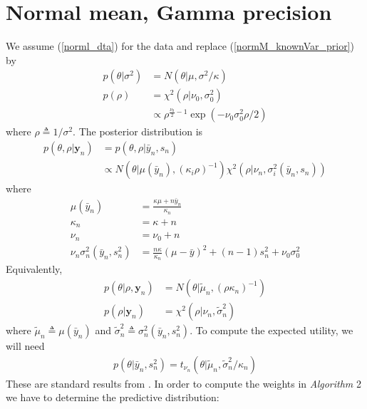 \documentclass[11pt]{article}
\begin{document}
\section{Normal mean, Gamma precision}
We  assume (\ref{norml_dta}) for the data and replace (\ref{normM_knownVar_prior}) by
\begin{align}
p(\theta|\sigma^2)&=N(\theta|\mu,\sigma^2/\kappa)\\
p(\rho)&=\chi^2(\rho|\nu_0,\sigma_0^2)\\
&\propto \rho^{\frac{\nu_0}{2}-1}\exp(-\nu_0\sigma_0^2\rho/2)
\end{align}where $\rho\triangleq 1/\sigma^2$. The posterior distribution is
\begin{align}
p(\theta,\rho|\mathbf{y}_{n})&=p(\theta,\rho|\bar{y}_{n},s_{n})\\
&\propto N(\theta|\mu(\bar{y}_{n}),(\kappa_i\rho)^{-1})\chi^2(\rho|\nu_{n},\sigma_i^2(\bar{y}_{n},s_{n}))
\end{align}where
\begin{align}
\mu(\bar{y}_{n})&=\frac{\kappa \mu+{n}\bar{y}_{n}}{\kappa_{n}}\\
\kappa_{n}&=\kappa+{n}\\
\nu_{n}&=\nu_0+{n}\\
\nu_{n} \sigma_{n}^2(\bar{y}_{n},s_{n}^2)&=\frac{{n} \kappa}{\kappa_{n}}(\mu-\bar{y})^2+({n}-1)s_{n}^2+\nu_0\sigma_0^2
\end{align}Equivalently,
\begin{align}
p(\theta|\rho,\mathbf{y}_{n})&= N(\theta|\tilde\mu_{n},(\rho \kappa_{n})^{-1})\\
p(\rho|\mathbf{y}_{n})&=\chi^2(\rho|\nu_n,\tilde\sigma_{n}^2)
\end{align}where $\tilde \mu_n \triangleq \mu(\bar{y}_n)$ and $\tilde \sigma_n^2 \triangleq \sigma_n^2(\bar{y}_{n},s_{n}^2)$. To compute the expected utility, we will need
\begin{align}
p(\theta|\bar{y}_{n},s_{n}^2)=t_{\nu_{n}}(\theta|\tilde\mu_{n},\tilde \sigma_{n}^2/\kappa_n)
\end{align}These are standard results from \cite[Section 3.3]{gelman2004}. In order to compute the weights in \textit{Algorithm} 2 we have to determine the predictive distribution:
\end{document}
